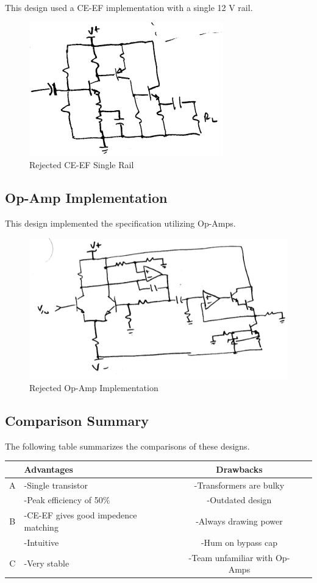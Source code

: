 \documentclass[journal]{IEEEtran}
\begin{document}
This design used a CE-EF implementation with a single 12 V rail.
\begin{figure}[H]
\centering
\includegraphics[scale=.4]{reject-2.png}
\caption{Rejected CE-EF Single Rail}
\label{fig_reject_2}
\end{figure}

\subsection{Op-Amp Implementation}

This design implemented the specification utilizing Op-Amps.

\begin{figure}[H]
\centering
\includegraphics[scale=.4]{reject-3.png}
\caption{Rejected Op-Amp Implementation}
\label{fig_reject_3}
\end{figure}

\subsection{Comparison Summary}

The following table summarizes the comparisons of these designs. 

\begin{tabular}{|c|p{2.5cm}|c|c|}
\hline
& Advantages & Drawbacks \\
\hline
A & -Single transistor & -Transformers are bulky\\
  & -Peak efficiency of 50\% & -Outdated design\\
\hline
B& -CE-EF gives good impedence matching & -Always drawing power \\
 & -Intuitive & -Hum on bypass cap\\
\hline
C & -Very stable & -Team unfamiliar with Op-Amps\\
\hline
\end{tabular}
\end{document}
